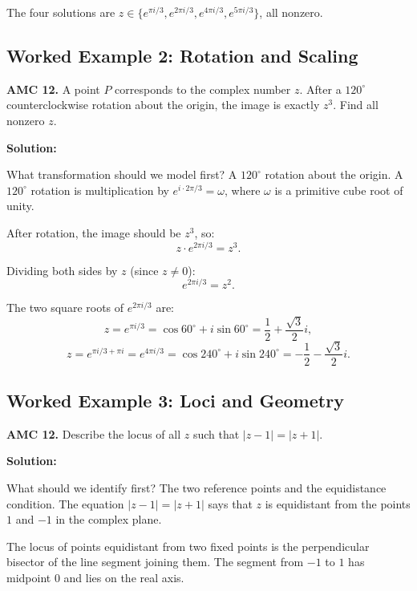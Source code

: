 \documentclass[12pt]{extarticle}
\begin{document}
The four solutions are $z \in \{e^{\pi i/3}, e^{2\pi i/3}, e^{4\pi i/3}, e^{5\pi i/3}\}$, all nonzero.


\subsection*{Worked Example 2: Rotation and Scaling}

\begin{examplebox}
\textbf{AMC 12.} A point $P$ corresponds to the complex number $z$. After a $120^\circ$ counterclockwise rotation about the origin, the image is exactly $z^3$. Find all nonzero $z$.
\end{examplebox}

\textbf{Solution:}

What transformation should we model first? A $120^\circ$ rotation about the origin.
A $120^\circ$ rotation is multiplication by $e^{i \cdot 2\pi/3} = \omega$, where $\omega$ is a primitive cube root of unity.

After rotation, the image should be $z^3$, so:
\[
z \cdot e^{2\pi i/3} = z^3.
\]

Dividing both sides by $z$ (since $z \neq 0$):
\[
e^{2\pi i/3} = z^2.
\]

The two square roots of $e^{2\pi i/3}$ are:
\[
z = e^{\pi i/3} = \cos 60^\circ + i\sin 60^\circ = \frac{1}{2} + \frac{\sqrt{3}}{2}i,
\]
\[
z = e^{\pi i/3 + \pi i} = e^{4\pi i/3} = \cos 240^\circ + i\sin 240^\circ = -\frac{1}{2} - \frac{\sqrt{3}}{2}i.
\]


\subsection*{Worked Example 3: Loci and Geometry}

\begin{examplebox}
\textbf{AMC 12.} Describe the locus of all $z$ such that $|z - 1| = |z + 1|$.
\end{examplebox}

\textbf{Solution:}

What should we identify first? The two reference points and the equidistance condition.
The equation $|z - 1| = |z + 1|$ says that $z$ is equidistant from the points $1$ and $-1$ in the complex plane.

The locus of points equidistant from two fixed points is the perpendicular bisector of the line segment joining them. The segment from $-1$ to $1$ has midpoint $0$ and lies on the real axis.
\end{document}
